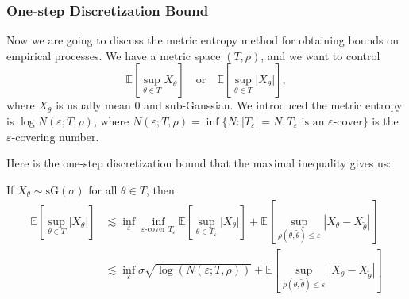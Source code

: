 \subsubsection{One-step Discretization Bound}
Now we are going to discuss the metric entropy method for obtaining bounds on empirical processes. We have a metric space $(T, \rho)$, and we want to control
\[
\mathbb{E}\left[\sup_{\theta \in T} X_\theta\right] \quad \text{or} \quad \mathbb{E}\left[\sup_{\theta \in T} |X_\theta|\right],
\]
where $X_\theta$ is usually mean 0 and sub-Gaussian. We introduced the metric entropy is $\log N(\varepsilon; T, \rho)$, where $N(\varepsilon; T, \rho) = \inf\{N : |T_\varepsilon| = N, T_\varepsilon \text{ is an } \varepsilon\text{-cover}\}$ is the $\varepsilon$-covering number.

Here is the one-step discretization bound that the maximal inequality gives us:

\begin{lem}
If $X_\theta \sim \mathrm{sG}(\sigma)$ for all $\theta \in T$, then
\begin{align*}
\mathbb{E}\left[\sup_{\theta \in T} |X_\theta|\right] &\lesssim \inf_{\varepsilon} \inf_{\varepsilon\text{-cover } T_\varepsilon} \mathbb{E}\left[\sup_{\theta \in T_\varepsilon} |X_\theta|\right] + \mathbb{E}\left[\sup_{\rho(\theta, \widetilde{\theta}) \leq \varepsilon} |X_\theta - X_{\widetilde{\theta}}|\right] \\
&\lesssim \inf_{\varepsilon} \sigma \sqrt{\log(N(\varepsilon; T, \rho))} + \mathbb{E}\left[\sup_{\rho(\theta, \widetilde{\theta}) \leq \varepsilon} |X_\theta - X_{\widetilde{\theta}}|\right]
\end{align*}
\end{lem}

